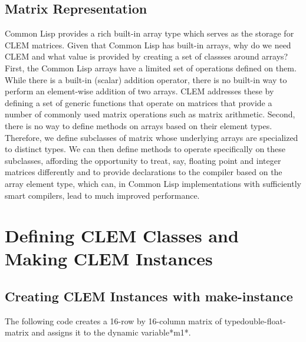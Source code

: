 \documentclass[10pt]{article}
\begin{document}
\subsection{Matrix Representation}
\baselineskip14pt
Common Lisp provides a rich built-in array type which serves as
 the storage for CLEM matrices. Given that Common Lisp has built-in
 arrays, why do we need CLEM and what value is provided by creating a
 set of classses around arrays? First, the Common Lisp arrays have a
 limited set of operations defined on them. While there is a built-in
 (scalar) addition operator, there is no built-in way to perform an
 element-wise addition of two arrays. CLEM addresses these by defining
 a set of generic functions that operate on matrices that provide a
 number of commonly used matrix operations such as matrix
 arithmetic. Second, there is no way to define methods on arrays based
 on their element types. Therefore, we define subclasses of matrix
 whose underlying arrays are specialized to distinct types. We can
 then define methods to operate specifically on these subclasses,
 affording the opportunity to treat, say, floating point and integer
 matrices differently and to provide declarations to the compiler
 based on the array element type, which can, in Common Lisp
 implementations with sufficiently smart compilers, lead to much
 improved performance.

\clearpage
\section{Defining CLEM Classes and Making CLEM Instances}
\baselineskip12pt
\subsection{Creating CLEM Instances with make-instance}
\baselineskip14pt
The following code creates a 16-row by 16-column matrix of typedouble-float-matrix and assigns it to the dynamic variable*m1*.
\end{document}
